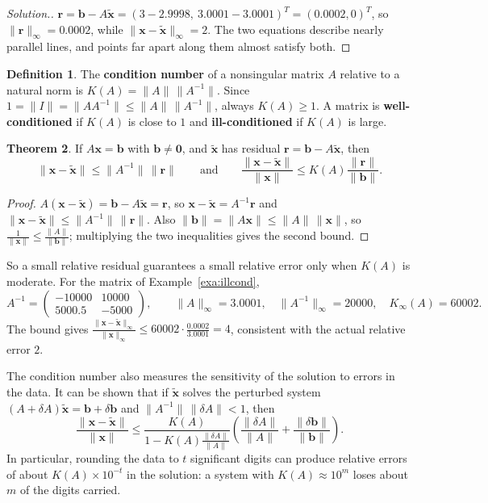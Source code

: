 \documentclass[11pt,a4paper]{article}
\numberwithin{equation}{section}
\theoremstyle{definition}
\newtheorem{thm}{Theorem}[subsection]
\newtheorem{defn}[thm]{Definition}
\newenvironment{solution}
  {\renewcommand{\qedsymbol}{}\begin{proof}[\textit{Solution}.]}
  {\end{proof}}
\begin{document}
\begin{solution}
$\mathbf r = \mathbf b-A\tilde{\mathbf x} = (3-2.9998,\ 3.0001-3.0001)^T = (0.0002, 0)^T$, so $\|\mathbf r\|_\infty = 0.0002$, while
$\|\mathbf x-\tilde{\mathbf x}\|_\infty = 2$. The two equations describe nearly parallel lines, and points far apart along them almost satisfy
both.
\end{solution}

\begin{defn}
The \textbf{condition number} of a nonsingular matrix $A$ relative to a natural norm is $K(A) = \|A\|\,\|A^{-1}\|$. Since
$1 = \|I\| = \|AA^{-1}\|\leq\|A\|\,\|A^{-1}\|$, always $K(A)\geq1$. A matrix is \textbf{well-conditioned} if $K(A)$ is close to $1$ and
\textbf{ill-conditioned} if $K(A)$ is large.
\end{defn}

\begin{thm}
\label{thm:residual}
If $A\mathbf x = \mathbf b$ with $\mathbf b\neq\mathbf 0$, and $\tilde{\mathbf x}$ has residual $\mathbf r = \mathbf b-A\tilde{\mathbf x}$, then
$$\|\mathbf x-\tilde{\mathbf x}\|\leq\|A^{-1}\|\,\|\mathbf r\|\qquad\text{and}\qquad\frac{\|\mathbf x-\tilde{\mathbf x}\|}{\|\mathbf x\|}\leq K(A)\frac{\|\mathbf r\|}{\|\mathbf b\|} .$$
\end{thm}

\begin{proof}
$A(\mathbf x-\tilde{\mathbf x}) = \mathbf b-A\tilde{\mathbf x} = \mathbf r$, so $\mathbf x-\tilde{\mathbf x} = A^{-1}\mathbf r$ and $\|\mathbf x-\tilde{\mathbf x}\|\leq\|A^{-1}\|\,\|\mathbf r\|$.
Also $\|\mathbf b\| = \|A\mathbf x\|\leq\|A\|\,\|\mathbf x\|$, so $\frac{1}{\|\mathbf x\|}\leq\frac{\|A\|}{\|\mathbf b\|}$; multiplying the two inequalities
gives the second bound.
\end{proof}

So a small relative residual guarantees a small relative error only when $K(A)$ is moderate. For the matrix of Example~\ref{exa:illcond},
$$A^{-1} = \begin{pmatrix}-10000&10000\\5000.5&-5000\end{pmatrix},\qquad \|A\|_\infty = 3.0001,\quad\|A^{-1}\|_\infty = 20000,\quad K_\infty(A) = 60002 .$$
The bound gives $\frac{\|\mathbf x-\tilde{\mathbf x}\|_\infty}{\|\mathbf x\|_\infty}\leq60002\cdot\frac{0.0002}{3.0001} = 4$, consistent with the actual
relative error $2$.

The condition number also measures the sensitivity of the solution to errors in the data. It can be shown that if $\tilde{\mathbf x}$ solves
the perturbed system $(A+\delta A)\tilde{\mathbf x} = \mathbf b+\delta\mathbf b$ and $\|A^{-1}\|\,\|\delta A\|<1$, then
$$\frac{\|\mathbf x-\tilde{\mathbf x}\|}{\|\mathbf x\|}\leq\frac{K(A)}{1-K(A)\frac{\|\delta A\|}{\|A\|}}\left(\frac{\|\delta A\|}{\|A\|}+\frac{\|\delta\mathbf b\|}{\|\mathbf b\|}\right).$$
In particular, rounding the data to $t$ significant digits can produce relative errors of about $K(A)\times10^{-t}$ in the solution: a
system with $K(A)\approx10^m$ loses about $m$ of the digits carried.
\end{document}
